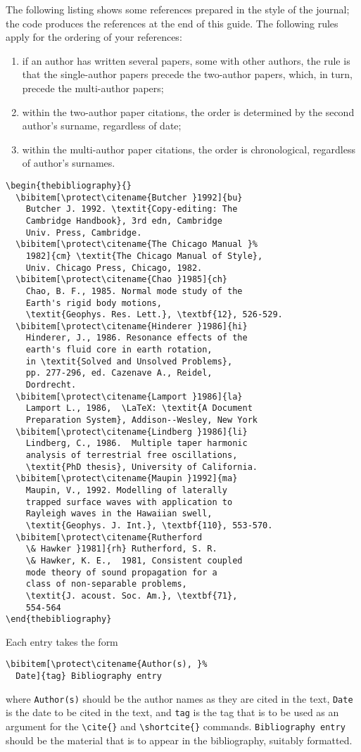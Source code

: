 The following listing shows some references prepared in the style of
the journal; the code produces the references at the end of this guide.
The following rules apply for the ordering of your references:
\begin{enumerate}
  \item if an author has written several papers, some with other authors, the
        rule is that the single-author papers precede the two-author papers,
        which, in turn, precede the multi-author papers;
  \item within the two-author paper citations, the order is determined by the
        second author's surname, regardless of date;
  \item within the multi-author paper citations, the order is chronological,
        regardless of author's surnames.
\end{enumerate}
%
\begin{verbatim}
\begin{thebibliography}{}
  \bibitem[\protect\citename{Butcher }1992]{bu}
    Butcher J. 1992. \textit{Copy-editing: The
    Cambridge Handbook}, 3rd edn, Cambridge
    Univ. Press, Cambridge.
  \bibitem[\protect\citename{The Chicago Manual }%
    1982]{cm} \textit{The Chicago Manual of Style},
    Univ. Chicago Press, Chicago, 1982.
  \bibitem[\protect\citename{Chao }1985]{ch}
    Chao, B. F., 1985. Normal mode study of the
    Earth's rigid body motions,
    \textit{Geophys. Res. Lett.}, \textbf{12}, 526-529.
  \bibitem[\protect\citename{Hinderer }1986]{hi}
    Hinderer, J., 1986. Resonance effects of the
    earth's fluid core in earth rotation,
    in \textit{Solved and Unsolved Problems},
    pp. 277-296, ed. Cazenave A., Reidel,
    Dordrecht.
  \bibitem[\protect\citename{Lamport }1986]{la}
    Lamport L., 1986,  \LaTeX: \textit{A Document
    Preparation System}, Addison--Wesley, New York
  \bibitem[\protect\citename{Lindberg }1986]{li}
    Lindberg, C., 1986.  Multiple taper harmonic
    analysis of terrestrial free oscillations,
    \textit{PhD thesis}, University of California.
  \bibitem[\protect\citename{Maupin }1992]{ma}
    Maupin, V., 1992. Modelling of laterally
    trapped surface waves with application to
    Rayleigh waves in the Hawaiian swell,
    \textit{Geophys. J. Int.}, \textbf{110}, 553-570.
  \bibitem[\protect\citename{Rutherford
    \& Hawker }1981]{rh} Rutherford, S. R.
    \& Hawker, K. E.,  1981, Consistent coupled
    mode theory of sound propagation for a
    class of non-separable problems,
    \textit{J. acoust. Soc. Am.}, \textbf{71},
    554-564
\end{thebibliography}
\end{verbatim}
Each entry takes the form
\begin{verbatim}
\bibitem[\protect\citename{Author(s), }%
  Date]{tag} Bibliography entry
\end{verbatim}
where \verb"Author(s)" should be the author names as they are cited in the text,
\verb"Date" is the date to be cited in the text, and \verb"tag" is the tag that
is to be used as an argument for the \verb"\cite{}" and \verb"\shortcite{}"
commands. \verb"Bibliography entry" should be the material that is to appear in
the bibliography, suitably formatted.

